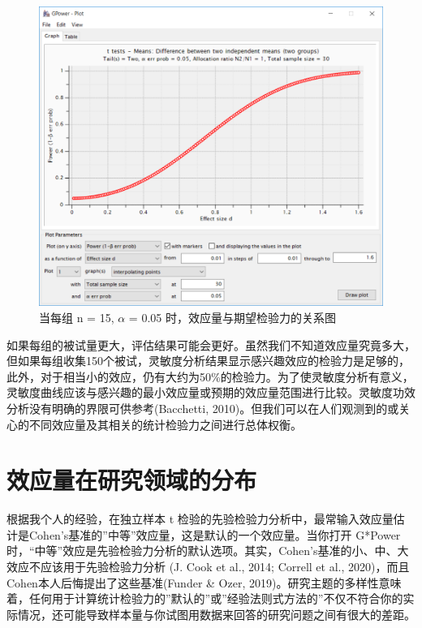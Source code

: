 \documentclass[
  letterpaper,
  DIV=11,
  numbers=noendperiod]{scrreprt}
\begin{document}
\begin{figure}

{\centering \includegraphics[width=1\textwidth,height=\textheight]{images/sensitivity1.png}

}

\caption{\label{fig-gsens1}当每组 n = 15, \(\alpha\) = 0.05
时，效应量与期望检验力的关系图}

\end{figure}

如果每组的被试量更大，评估结果可能会更好。虽然我们不知道效应量究竟多大，但如果每组收集150个被试，灵敏度分析结果显示感兴趣效应的检验力是足够的，此外，对于相当小的效应，仍有大约为50\%的检验力。为了使灵敏度分析有意义，灵敏度曲线应该与感兴趣的最小效应量或预期的效应量范围进行比较。灵敏度功效分析没有明确的界限可供参考(Bacchetti,
2010)。但我们可以在人们观测到的或关心的不同效应量及其相关的统计检验力之间进行总体权衡。

\hypertarget{ux6548ux5e94ux91cfux5728ux7814ux7a76ux9886ux57dfux7684ux5206ux5e03}{%
\section{效应量在研究领域的分布}\label{ux6548ux5e94ux91cfux5728ux7814ux7a76ux9886ux57dfux7684ux5206ux5e03}}

根据我个人的经验，在独立样本 t
检验的先验检验力分析中，最常输入效应量估计是Cohen's基准的''中等''效应量，这是默认的一个效应量。当你打开
G*Power
时，``中等''效应是先验检验力分析的默认选项。其实，Cohen's基准的小、中、大效应不应该用于先验检验力分析
(J. Cook et al., 2014; Correll et al.,
2020)，而且Cohen本人后悔提出了这些基准(Funder \& Ozer,
2019)。研究主题的多样性意味着，任何用于计算统计检验力的''默认的''或''经验法则式方法的''不仅不符合你的实际情况，还可能导致样本量与你试图用数据来回答的研究问题之间有很大的差距。
\end{document}
